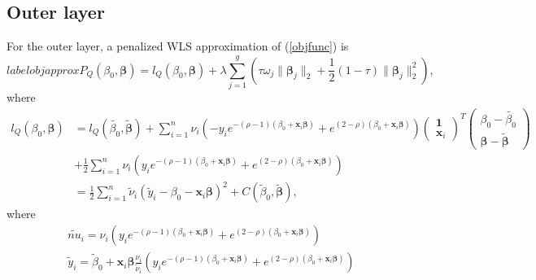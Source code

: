 \documentclass[paper=a4, fontsize=11pt]{scrartcl} %
\begin{document}
\subsection*{\textbf{Outer layer}}
For the outer layer, a penalized WLS approximation of (\ref{objfunc}) is
\begin{equation}label{objapprox}
P_{Q}(\beta_{0},\boldsymbol{\beta})=l_{Q}(\beta_{0},\boldsymbol{\beta})+\lambda\sum_{j=1}^{g}(\tau\omega_{j}\|\boldsymbol{\beta}_{j}\|_{2}+\frac{1}{2}(1-\tau)\|\boldsymbol{\beta}_{j}\|_{2}^{2}),
\end{equation}
where
\begin{equation*}
\begin{split}
l_{Q}(\beta_{0},\boldsymbol{\beta})&=l_{Q}(\tilde{\beta_{0}},\tilde{\boldsymbol{\beta}})+\sum_{i=1}^{n}{\nu_{i}(-y_{i}e^{-(\rho-1)(\beta_{0}+\boldsymbol{x}_{i}\boldsymbol{\beta})}+e^{(2-\rho)(\beta_{0}+\boldsymbol{x}_{i}\boldsymbol{\beta})})\begin{pmatrix}\boldsymbol{1}\\ \boldsymbol{x}_{i}\end{pmatrix}^{T}\begin{pmatrix}\beta_{0}-\tilde{\beta_{0}}\\ \boldsymbol{\beta}-\tilde{\boldsymbol{\beta}}\end{pmatrix}}\\
&+\frac{1}{2}\sum_{i=1}^{n}{\nu_{i}(y_{i}e^{-(\rho-1)(\beta_{0}+\boldsymbol{x}_{i}\boldsymbol{\beta})}+e^{(2-\rho)(\beta_{0}+\boldsymbol{x}_{i}\boldsymbol{\beta})})}\\
&=\frac{1}{2}\sum_{i=1}^{n}{\tilde{\nu}_{i}(\tilde{y}_{i}-\beta_{0}-\boldsymbol{x}_{i}\boldsymbol{\beta})^{2}}+C(\tilde{\beta}_{0},\tilde{\boldsymbol{\beta}}),
\end{split}
\end{equation*}
where
\begin{equation}
\begin{split}
\tilde{nu}_{i}=\nu_{i}(y_{i}e^{-(\rho-1)(\beta_{0}+\boldsymbol{x}_{i}\boldsymbol{\beta})}+e^{(2-\rho)(\beta_{0}+\boldsymbol{x}_{i}\boldsymbol{\beta})})\\
\tilde{y}_{i}=\tilde{\beta}_{0}+\boldsymbol{x}_{i}\boldsymbol{\beta}\frac{\nu_{i}}{\tilde{\nu}_{i}}(y_{i}e^{-(\rho-1)(\beta_{0}+\boldsymbol{x}_{i}\boldsymbol{\beta})}+e^{(2-\rho)(\beta_{0}+\boldsymbol{x}_{i}\boldsymbol{\beta})})
\end{split}
\end{equation}
\end{document}
